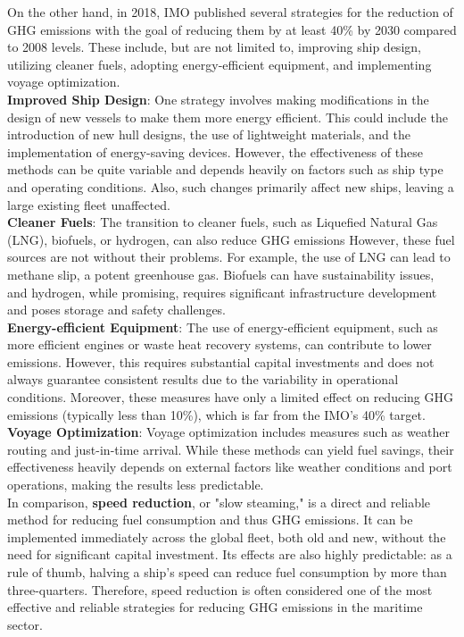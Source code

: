 \documentclass[a4paper,12pt]{article}
\begin{document}
On the other hand, in 2018, IMO published several strategies for the reduction of GHG emissions with the goal of reducing them by at least 40\% by 2030 compared to 2008 levels.
These include, but are not limited to, improving ship design, utilizing cleaner fuels, adopting energy-efficient equipment, and implementing voyage optimization.\\

\textbf{Improved Ship Design}: One strategy involves making modifications in the design of new vessels to make them more energy efficient.
This could include the introduction of new hull designs, the use of lightweight materials, and the implementation of energy-saving devices.
However, the effectiveness of these methods can be quite variable and depends heavily on factors such as ship type and operating conditions.
Also, such changes primarily affect new ships, leaving a large existing fleet unaffected.\\

\textbf{Cleaner Fuels}: The transition to cleaner fuels, such as Liquefied Natural Gas (LNG), biofuels, or hydrogen, can also reduce GHG emissions
However, these fuel sources are not without their problems. For example, the use of LNG can lead to methane slip, a potent greenhouse gas.
Biofuels can have sustainability issues, and hydrogen, while promising, requires significant infrastructure development and poses storage and safety challenges.\\

\textbf{Energy-efficient Equipment}: The use of energy-efficient equipment, such as more efficient engines or waste heat recovery systems, can contribute to lower emissions. However, this requires substantial capital investments and does not always guarantee consistent results due to the variability in operational conditions.
Moreover, these measures have only a limited effect on reducing GHG emissions (typically less than 10\%), which is far from the IMO's 40\% target.\\

\textbf{Voyage Optimization}: Voyage optimization includes measures such as weather routing and just-in-time arrival. While these methods can yield fuel savings, their effectiveness heavily depends on external factors like weather conditions and port operations, making the results less predictable.\\

In comparison, \textbf{speed reduction}, or "slow steaming," is a direct and reliable method for reducing fuel consumption and thus GHG emissions.
It can be implemented immediately across the global fleet, both old and new, without the need for significant capital investment.
Its effects are also highly predictable: as a rule of thumb, halving a ship's speed can reduce fuel consumption by more than three-quarters.
Therefore, speed reduction is often considered one of the most effective and reliable strategies for reducing GHG emissions in the maritime sector.\\
\end{document}
